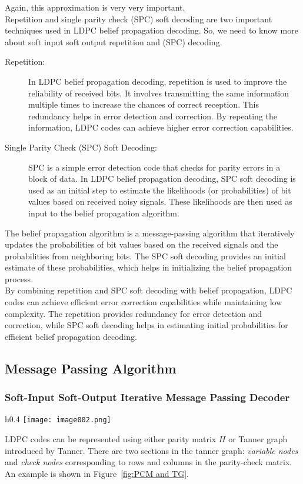 Again, this approximation is very very important.\\
Repetition and single parity check (SPC) soft decoding are two important techniques used in LDPC belief propagation decoding. So, we need to know more about soft input soft output repetition and (SPC) decoding.
\begin{description}
    \item[Repetition:] In LDPC belief propagation decoding, repetition is used to improve the reliability of received bits. It involves transmitting the same information multiple times to increase the chances of correct reception. This redundancy helps in error detection and correction. By repeating the information, LDPC codes can achieve higher error correction capabilities.
    \item[Single Parity Check (SPC) Soft Decoding:] SPC is a simple error detection code that checks for parity errors in a block of data. In LDPC belief propagation decoding, SPC soft decoding is used as an initial step to estimate the likelihoods (or probabilities) of bit values based on received noisy signals. These likelihoods are then used as input to the belief propagation algorithm.
\end{description}
The belief propagation algorithm is a message-passing algorithm that iteratively updates the probabilities of bit values based on the received signals and the probabilities from neighboring bits. The SPC soft decoding provides an initial estimate of these probabilities, which helps in initializing the belief propagation process.\\
By combining repetition and SPC soft decoding with belief propagation, LDPC codes can achieve efficient error correction capabilities while maintaining low complexity. The repetition provides redundancy for error detection and correction, while SPC soft decoding helps in estimating initial probabilities for efficient belief propagation decoding.

\subsection{Message Passing Algorithm}
\subsubsection{Soft-Input Soft-Output Iterative Message Passing Decoder}
\begin{wrapfigure}{h}{0.4\textwidth}
    \centering
    \texttt{[image: image002.png]}
    \caption{Parity Check Matrix and Tanner Graph}
    \label{fig:PCM and TG}
\end{wrapfigure}
LDPC codes can be represented using either parity matrix $H$ or Tanner graph introduced by Tanner. There are two sections in the tanner graph:
\textit{variable nodes} and \textit{check nodes} corresponding to rows and columns in the parity-check matrix. An example is shown in Figure~\ref{fig:PCM and TG}.

